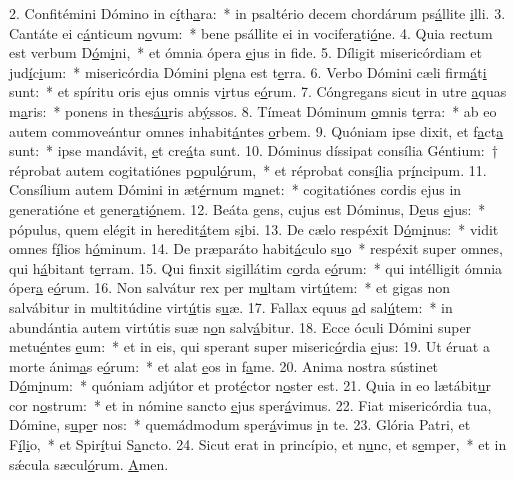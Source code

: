 2. Confitémini Dómino in c\uline{í}th\uline{a}ra:~* in psaltério decem chordárum ps\uline{á}llite \uline{i}lli.
3. Cantáte ei c\uline{á}nticum n\uline{o}vum:~* bene psállite ei in vocifer\uline{a}ti\uline{ó}ne.
4. Quia rectum est verbum D\uline{ó}m\uline{i}ni,~* et ómnia ópera \uline{e}jus in f\uline{i}de.
5. Díligit misericórdiam et jud\uline{í}c\uline{i}um:~* misericórdia Dómini pl\uline{e}na est t\uline{e}rra.
6. Verbo Dómini cæli firm\uline{á}t\uline{i} sunt:~* et spíritu oris ejus omnis v\uline{i}rtus e\uline{ó}rum.
7. Cóngregans sicut in utre \uline{a}quas m\uline{a}ris:~* ponens in thes\uline{áu}ris ab\uline{ý}ssos.
8. Tímeat Dóminum \uline{o}mnis t\uline{e}rra:~* ab eo autem commoveántur omnes inhabit\uline{á}ntes \uline{o}rbem.
9. Quóniam ipse dixit, et f\uline{a}ct\uline{a} sunt:~* ipse mandávit, \uline{e}t cre\uline{á}ta sunt.
10. Dóminus díssipat consília Géntium:~† réprobat autem cogitatiónes p\uline{o}pul\uline{ó}rum,~* et réprobat cons\uline{í}lia pr\uline{í}ncipum.
11. Consílium autem Dómini in æt\uline{é}rnum m\uline{a}net:~* cogitatiónes cordis ejus in generatióne et gener\uline{a}ti\uline{ó}nem.
12. Beáta gens, cujus est Dóminus, D\uline{e}us \uline{e}jus:~* pópulus, quem elégit in heredit\uline{á}tem s\uline{i}bi.
13. De cælo respéxit D\uline{ó}m\uline{i}nus:~* vidit omnes f\uline{í}lios h\uline{ó}minum.
14. De præparáto habit\uline{á}culo s\uline{u}o~* respéxit super omnes, qui h\uline{á}bitant t\uline{e}rram.
15. Qui finxit sigillátim c\uline{o}rda e\uline{ó}rum:~* qui intélligit ómnia óper\uline{a} e\uline{ó}rum.
16. Non salvátur rex per m\uline{u}ltam virt\uline{ú}tem:~* et gigas non salvábitur in multitúdine virt\uline{ú}tis s\uline{u}æ.
17. Fallax equus \uline{a}d sal\uline{ú}tem:~* in abundántia autem virtútis suæ n\uline{o}n salv\uline{á}bitur.
18. Ecce óculi Dómini super metu\uline{é}ntes \uline{e}um:~* et in eis, qui sperant super miseric\uline{ó}rdia \uline{e}jus:
19. Ut éruat a morte ánim\uline{a}s e\uline{ó}rum:~* et alat \uline{e}os in f\uline{a}me.
20. Anima nostra sústinet D\uline{ó}m\uline{i}num:~* quóniam adjútor et prot\uline{é}ctor n\uline{o}ster est.
21. Quia in eo lætábit\uline{u}r cor n\uline{o}strum:~* et in nómine sancto \uline{e}jus sper\uline{á}vimus.
22. Fiat misericórdia tua, Dómine, s\uline{u}p\uline{e}r nos:~* quemádmodum sper\uline{á}vimus \uline{i}n te.
23. Glória Patri, et F\uline{í}l\uline{i}o,~* et Spir\uline{í}tui S\uline{a}ncto.
24. Sicut erat in princípio, et n\uline{u}nc, et s\uline{e}mper,~* et in sǽcula sæcul\uline{ó}rum. \uline{A}men.
